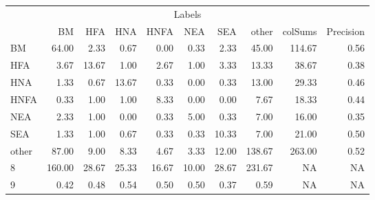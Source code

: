 \begin{table}
\centering\begingroup\fontsize{11}{13}\selectfont

\begin{tabular}{lrrrrrr>{}r|rr}
\toprule
\multicolumn{10}{c}{Labels} \\
\cmidrule(l{3pt}r{3pt}){1-10}
  & BM & HFA & HNA & HNFA & NEA & SEA & other & colSums & Precision\\
\midrule
BM & 64.00 & 2.33 & 0.67 & 0.00 & 0.33 & 2.33 & 45.00 & 114.67 & 0.56\\
HFA & 3.67 & 13.67 & 1.00 & 2.67 & 1.00 & 3.33 & 13.33 & 38.67 & 0.38\\
HNA & 1.33 & 0.67 & 13.67 & 0.33 & 0.00 & 0.33 & 13.00 & 29.33 & 0.46\\
HNFA & 0.33 & 1.00 & 1.00 & 8.33 & 0.00 & 0.00 & 7.67 & 18.33 & 0.44\\
NEA & 2.33 & 1.00 & 0.00 & 0.33 & 5.00 & 0.33 & 7.00 & 16.00 & 0.35\\
\addlinespace
SEA & 1.33 & 1.00 & 0.67 & 0.33 & 0.33 & 10.33 & 7.00 & 21.00 & 0.50\\
other & 87.00 & 9.00 & 8.33 & 4.67 & 3.33 & 12.00 & 138.67 & 263.00 & 0.52\\
8 & 160.00 & 28.67 & 25.33 & 16.67 & 10.00 & 28.67 & 231.67 & NA & NA\\
9 & 0.42 & 0.48 & 0.54 & 0.50 & 0.50 & 0.37 & 0.59 & NA & NA\\
\bottomrule
\end{tabular}
\endgroup{}
\end{table}
